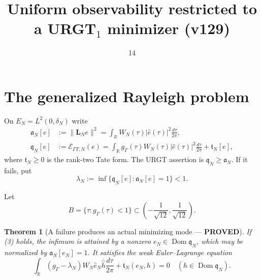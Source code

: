 \documentclass[11pt]{article}
\title{Uniform observability restricted to a URGT$_1$ minimizer (v129)}
\date{14}
\newcommand{\PROVED}{\textcolor{green!40!black}{\textbf{PROVED}}}
\newtheorem{theorem}{Theorem}
\begin{document}
\maketitle

\section{The generalized Rayleigh problem}

On $E_N=L^2(0,\delta_N)$ write
\begin{align}
 \mathfrak a_N[e]
 &:=\|\mathbf L_Ne\|^2
 =\int_{\mathbb R}W_N(\tau)|\widehat e(\tau)|^2
                    \frac{d\tau}{2\pi},                   \tag{1}\\
 \mathfrak q_N[e]
 &:=\mathcal E_{\Gamma T,N}(e)
 =\int_{\mathbb R}g_\Gamma(\tau)W_N(\tau)|\widehat e(\tau)|^2
                    \frac{d\tau}{2\pi}+\mathfrak t_N[e], \tag{2}
\end{align}
where $\mathfrak t_N\ge0$ is the rank-two Tate form.  The URGT assertion
is $\mathfrak q_N\ge\mathfrak a_N$.  If it fails, put
\begin{equation}
 \lambda_N:=\inf\{\mathfrak q_N[e]:\mathfrak a_N[e]=1\}<1. \tag{3}
\end{equation}

Let
\begin{equation}
 B=\{\tau:g_\Gamma(\tau)<1\}
 \subset\left(-\frac1{\sqrt{12}},\frac1{\sqrt{12}}\right).
                                                                    \tag{4}
\end{equation}

\begin{theorem}[A failure produces an actual minimizing mode --- \PROVED]
If (3) holds, the infimum is attained by a nonzero
$e_N\in\operatorname{Dom}\mathfrak q_N$, which may be normalized by
$\mathfrak a_N[e_N]=1$.  It satisfies the weak Euler--Lagrange equation
\begin{equation}
 \boxed{
 \int_{\mathbb R}(g_\Gamma-\lambda_N)W_N
       \widehat e_N\overline{\widehat h}\frac{d\tau}{2\pi}
 +\mathfrak t_N(e_N,h)=0
 \quad(h\in\operatorname{Dom}\mathfrak q_N).}             \tag{5}
\end{equation}
\end{theorem}
\end{document}
